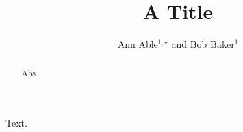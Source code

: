 \documentclass{revtex4-1}
\begin{document}
\title{A Title}
\author{Ann Able$^{1,\star}$ and Bob Baker$^{1}$}
\begin{abstract}Abs.\end{abstract}
\maketitle
Text.
\end{document}

